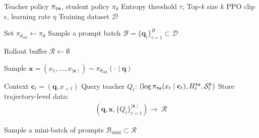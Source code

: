 \begin{algorithm}[!t]
\caption{\methodfullname}
\label{alg:eaopd}
\begin{algorithmic}[1]

\REQUIRE Teacher policy $\pi_{\tt{te}}$, student policy $\pi_\theta$
\REQUIRE Entropy threshold $\tau$, Top-$k$ size $k$
\REQUIRE PPO clip $\epsilon$, learning rate $\eta$
\REQUIRE Training dataset $\mathcal{D}$


    \STATE Set $\pi_{\theta_{\text{old}}} \leftarrow \pi_\theta$
    \STATE Sample a prompt batch
    $\mathcal{B} = \{\mathbf{q}_i\}_{i=1}^{B} \subset \mathcal{D}$

    \STATE Rollout buffer
    $\mathcal{R} \leftarrow \emptyset$

        \STATE Sample $\mathbf{x}=(x_1,\dots,x_{\mid \mathbf{x} \mid})
        \sim \pi_{\theta_{\text{old}}}(\cdot \mid \mathbf{q})$

            \STATE Context
            $\mathbf{c}_t = (\mathbf{q}, x_{<t})$
            \STATE Query teacher $Q_t$: $(\log\pi_{\tt{te}}(x_t \mid \mathbf{c}_t),
            H^{\tt{te}}_t,
            \mathcal{S}^k_t)$
        \ENDFOR
        \STATE Store trajectory-level data:
        \[
        \begin{aligned}
        \left(\mathbf{q},\mathbf{x},
        \{Q_t\}_{t=1}^{\mid\mathbf{x}\mid}\right)\rightarrow\; \mathcal{R}
        \end{aligned}
        \]
    \ENDFOR

        \STATE Sample a mini-batch of prompts
        $\mathcal{B}_{\text{mini}} \subset \mathcal{R}$


\end{algorithmic}
\end{algorithm}
